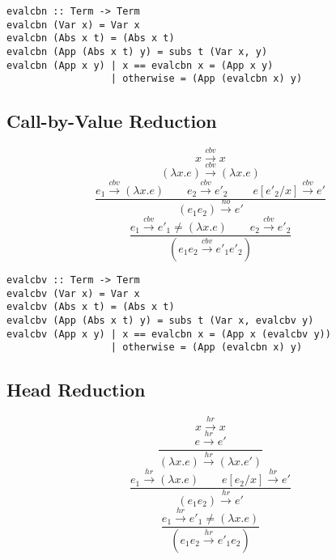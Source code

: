 \documentclass[a4paper,11pt,twoside]{report}
\begin{document}
\begin{verbatim}
evalcbn :: Term -> Term
evalcbn (Var x) = Var x
evalcbn (Abs x t) = (Abs x t)
evalcbn (App (Abs x t) y) = subs t (Var x, y)
evalcbn (App x y) | x == evalcbn x = (App x y)
                  | otherwise = (App (evalcbn x) y) 
\end{verbatim}


\subsection{Call-by-Value Reduction}

\begin{equation*}
x \xrightarrow{cbv}x
\end{equation*}
\begin{equation*}
(\lambda x.e) \xrightarrow{cbv} (\lambda x.e)
\end{equation*}
\begin{equation*}
\frac{e_1 \xrightarrow{cbv} (\lambda x.e)\ \ \ \ \ \ \ \ \ e_2\xrightarrow{cbv} e'_2\ \ \ \ \ \ \ \ \ \ e[e'_2/x] \xrightarrow{cbv} e'}{(e_1e_2) \xrightarrow{no} e'}
\end{equation*}
\begin{equation*}
\frac{e_1 \xrightarrow{cbv} e'_1\neq (\lambda x.e)\ \ \ \ \ \ \ \ \ e_2 \xrightarrow{cbv} e'_2}{(e_1e_2 \xrightarrow{cbv}e'_1e'_2)}
\end{equation*}


\begin{verbatim}
evalcbv :: Term -> Term
evalcbv (Var x) = Var x
evalcbv (Abs x t) = (Abs x t)
evalcbv (App (Abs x t) y) = subs t (Var x, evalcbv y)
evalcbv (App x y) | x == evalcbn x = (App x (evalcbv y))
                  | otherwise = (App (evalcbn x) y)  
\end{verbatim}



\subsection{Head Reduction}

\begin{equation*}
x \xrightarrow{hr}x
\end{equation*}
\begin{equation*}
\frac{e \xrightarrow{hr}e'}{(\lambda x.e) \xrightarrow{hr} (\lambda x.e')}
\end{equation*}
\begin{equation*}
\frac{e_1 \xrightarrow{hr} (\lambda x.e)\ \ \ \ \ \ \ \ \ e[e_2/x] \xrightarrow{hr} e'}{(e_1e_2) \xrightarrow{hr} e'}
\end{equation*}
\begin{equation*}
\frac{e_1 \xrightarrow{hr} e'_1\neq (\lambda x.e)}{(e_1e_2 \xrightarrow{hr}e'_1e_2)}
\end{equation*}
\end{document}
